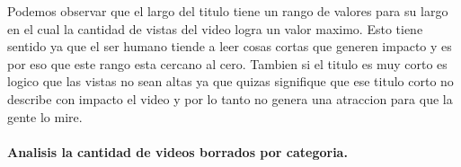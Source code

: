             \begin{figure}[ht]
            \end{figure}
        \FloatBarrier
        Podemos observar que el largo del titulo tiene un rango de valores para
        su largo en el cual la cantidad de vistas del video logra un valor maximo.
        Esto tiene sentido ya que el ser humano tiende a leer cosas cortas que
        generen impacto y es por eso que este rango esta cercano al cero. Tambien
        si el titulo es muy corto es logico que las vistas no sean altas ya que quizas
        signifique que ese titulo corto no describe con impacto el video y por lo tanto
        no genera una atraccion para que la gente lo mire.

        \newpage
        \paragraph{Analisis la cantidad de videos borrados por categoria.}

